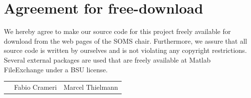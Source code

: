 \documentclass[11pt]{article}
\begin{document}

\newpage


\newpage
\section*{Agreement for free-download}
\bigskip


\bigskip


\large We hereby agree to make our source code for this project freely available for download from the web pages of the SOMS chair. Furthermore, we assure that all source code is written by ourselves and is not violating any copyright restrictions.
Several external packages are used that are freely available at Matlab FileExchange under a BSU license. 
\begin{center}

\bigskip


\bigskip


\begin{tabular}{@{}p{3.3cm}@{}p{6cm}@{}@{}p{6cm}@{}}
\begin{minipage}{3cm}

\end{minipage}
&
\begin{minipage}{6cm}
\vspace{2mm} \large Fabio Crameri


\end{minipage}
&
\begin{minipage}{6cm}

\vspace{2mm} \large Marcel Thielmann

\end{minipage}
\end{tabular}


\end{center}
\newpage







\tableofcontents
\end{document}
